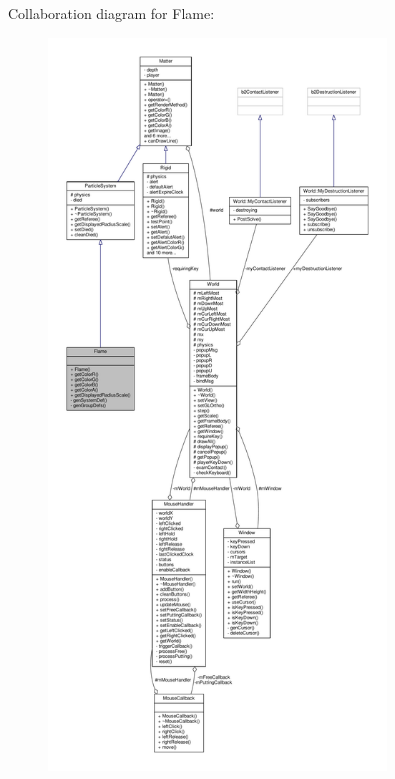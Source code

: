 Collaboration diagram for Flame\+:
\nopagebreak
\begin{figure}[H]
\begin{center}
\leavevmode
\includegraphics[height=550pt]{classFlame__coll__graph}
\end{center}
\end{figure}
